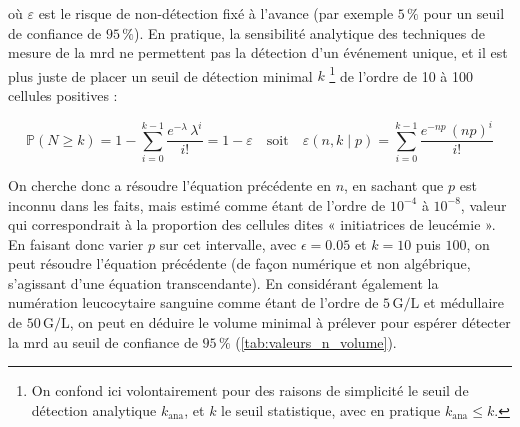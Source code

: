 où $\varepsilon$ est le risque de non-détection fixé à l'avance (par exemple
$5\,\%$ pour un seuil de confiance de $95\,\%$). En pratique, la sensibilité
analytique des techniques de mesure de la \gls{mrd} ne permettent pas la
détection d'un événement unique, et il est plus juste de placer un seuil de
détection minimal $k$ \footnote{On confond ici volontairement pour des raisons
de simplicité le seuil de détection analytique $k_{\text{ana}}$, et $k$ le
seuil statistique, avec en pratique $k_{\text{ana}} \leq k$.} de l'ordre de 10 à
100 cellules positives :

\begin{equation}
    \mathbb{P}(N \geq k) = 1 - \sum_{i = 0}^{k-1} \frac{e^{-\lambda} \, \lambda^{i}}{i!} = 1 - \varepsilon
    \quad \text{soit} \quad \varepsilon(n,k \mid p) = \sum_{i = 0}^{k-1} \frac{e^{-np} \, (np)^{i}}{i!}
\end{equation}

On cherche donc a résoudre l'équation précédente en $n$, en sachant que $p$ est
inconnu dans les faits, mais estimé comme étant de l'ordre de $10^{-4}$ à
$10^{-8}$, valeur qui correspondrait à la proportion des cellules dites «
initiatrices de leucémie ». En faisant donc varier $p$ sur cet intervalle, avec
$\epsilon = 0.05$ et $k = 10$ puis $100$, on peut résoudre l'équation
précédente (de façon numérique et non algébrique, s'agissant d'une équation
transcendante). En considérant également la numération leucocytaire sanguine
comme étant de l'ordre de $5\,\text{G/L}$ et médullaire de $50\,\text{G/L}$, on
peut en déduire le volume minimal à prélever pour espérer détecter la \gls{mrd}
au seuil de confiance de $95\,\%$ (\autoref{tab:valeurs_n_volume}).

